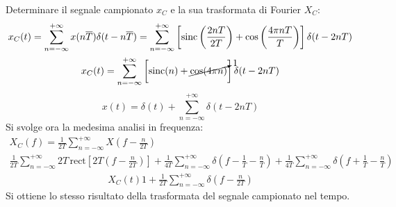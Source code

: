 \documentclass{article}
\begin{document}
Determinare il segnale campionato $x_C$ e la sua trasformata di Fourier $X_C$:
\begin{gather*}
    x_C(t)=\displaystyle\sum_{n=-\infty}^{+\infty}x(n\overline{T})\delta(t-n\overline{T})=\sum_{n=-\infty}^{+\infty}\left[\mbox{sinc}\left(\frac{2nT}{2T}\right)+\cos\left(\frac{4\pi nT}{T}\right)\right]\delta(t-2nT)\\
    x_C(t)=\displaystyle\sum_{n=-\infty}^{+\infty}\left[\mbox{sinc}(n)+\cancelto{1}{\cos(4\pi n)}\right]\delta(t-2nT)
\end{gather*}
\begin{equation}
    x(t)=\displaystyle\delta(t)+\sum_{n=-\infty}^{+\infty}\delta(t-2nT)
\end{equation}
Si svolge ora la medesima analisi in frequenza:
\begin{gather*}
    X_C(f)=\displaystyle\frac{1}{2T}\sum_{n=-\infty}^{+\infty}X\left(f-\frac{n}{2T}\right)\\
    \displaystyle\frac{1}{2T}\sum_{n=-\infty}^{+\infty}2T\,\mbox{rect}\left[2T\left(f-\frac{n}{2T}\right)\right]+\frac{1}{4T}\sum_{n=-\infty}^{+\infty}\delta\left(f-\frac{1}{T}-\frac{n}{T}\right)+\frac{1}{4T}\sum_{n=-\infty}^{+\infty}\delta\left(f+\frac{1}{T}-\frac{n}{T}\right)
\end{gather*}
\begin{gather}
    X_C(t)1+\displaystyle\frac{1}{2T}\sum_{n=-\infty}^{+\infty}\delta\left(f-\frac{n}{2T}\right)
\end{gather}
Si ottiene lo stesso risultato della trasformata del segnale campionato nel tempo. 
\end{document}
